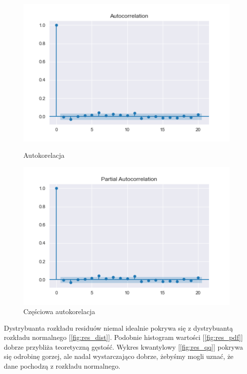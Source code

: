 \documentclass{article}
\theoremstyle{break}
\begin{document}
	\begin{figure}[H]
		\begin{center}
			\begin{minipage}{0.49\linewidth}
				\centering
				\includegraphics[scale=0.49]{acf_res.png}
				\caption{Autokorelacja}
				\label{fig:acf_res}
			\end{minipage}
			\begin{minipage}{0.49\linewidth}
				\centering
				\includegraphics[scale=0.49]{pacf_res.png}
				\caption{Częściowa autokorelacja}
				\label{fig:pacf_res}
			\end{minipage}
		\end{center}
	\end{figure}
	
	Dystrybuanta rozkładu residuów niemal idealnie pokrywa się z dystrybuantą rozkładu normalnego [\ref{fig:res_dist}]. Podobnie histogram wartości [\ref{fig:res_pdf}] dobrze przybliża teoretyczną gęstość. Wykres kwantylowy [\ref{fig:res_qq}] pokrywa się odrobinę gorzej, ale nadal wystarczająco dobrze, żebyśmy mogli uznać, że dane pochodzą z rozkładu normalnego.
	
\end{document}
